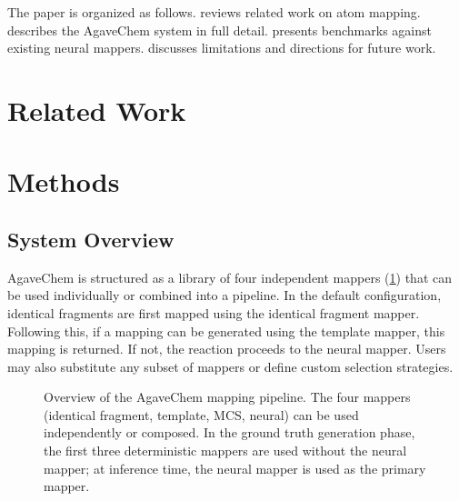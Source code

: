 \documentclass[12pt]{article}
\begin{document}
The paper is organized as follows.   reviews related
work on atom mapping.   describes the AgaveChem
system in full detail.   presents benchmarks against
existing neural mappers.   discusses limitations
and directions for future work.

\section{Related Work}
\label{sec:related}


\section{Methods}
\label{sec:methods}

\subsection{System Overview}
\label{subsec:overview}

AgaveChem is structured as a library of four independent mappers
(\cref{fig:overview}) that can be used individually or combined into
a pipeline.  In the default configuration, identical fragments are first
mapped using the identical fragment mapper. Following this, if a mapping 
can be generated using the template mapper, this mapping is returned. If 
not, the reaction proceeds to the neural mapper. Users may also substitute any subset of mappers or
define custom selection strategies.

\begin{figure}[htbp]
  \centering
  \caption{Overview of the AgaveChem mapping pipeline.  The four
    mappers (identical fragment, template, MCS, neural) can be used
    independently or composed.  In the ground truth generation phase,
    the first three deterministic mappers are used without the neural
    mapper; at inference time, the neural mapper is used as the
    primary mapper.}
  \label{fig:overview}
\end{figure}
\end{document}
